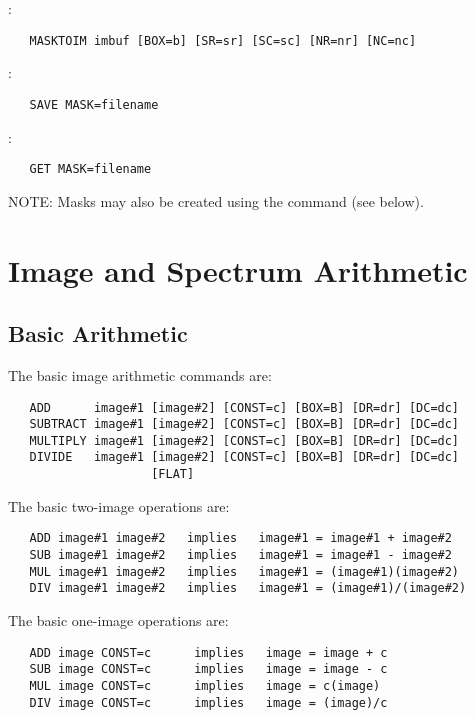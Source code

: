 \noindent {}:
\begin{verbatim}
   MASKTOIM imbuf [BOX=b] [SR=sr] [SC=sc] [NR=nr] [NC=nc]
\end{verbatim}

\noindent {}:
\begin{verbatim}
   SAVE MASK=filename
\end{verbatim}

\noindent {}:
\begin{verbatim}
   GET MASK=filename
\end{verbatim}

\noindent NOTE:  Masks may also be created using the  command
(see below).


\section{Image and Spectrum Arithmetic}

\subsection{Basic Arithmetic}

The basic image arithmetic commands are:
\begin{verbatim}
   ADD      image#1 [image#2] [CONST=c] [BOX=B] [DR=dr] [DC=dc]
   SUBTRACT image#1 [image#2] [CONST=c] [BOX=B] [DR=dr] [DC=dc]
   MULTIPLY image#1 [image#2] [CONST=c] [BOX=B] [DR=dr] [DC=dc]
   DIVIDE   image#1 [image#2] [CONST=c] [BOX=B] [DR=dr] [DC=dc]
                    [FLAT]
\end{verbatim}

\noindent The basic two-image operations are:
\begin{verbatim}
   ADD image#1 image#2   implies   image#1 = image#1 + image#2
   SUB image#1 image#2   implies   image#1 = image#1 - image#2
   MUL image#1 image#2   implies   image#1 = (image#1)(image#2)
   DIV image#1 image#2   implies   image#1 = (image#1)/(image#2)
\end{verbatim}

\noindent The basic one-image operations are:
\begin{verbatim}
   ADD image CONST=c      implies   image = image + c
   SUB image CONST=c      implies   image = image - c
   MUL image CONST=c      implies   image = c(image)
   DIV image CONST=c      implies   image = (image)/c
\end{verbatim}

